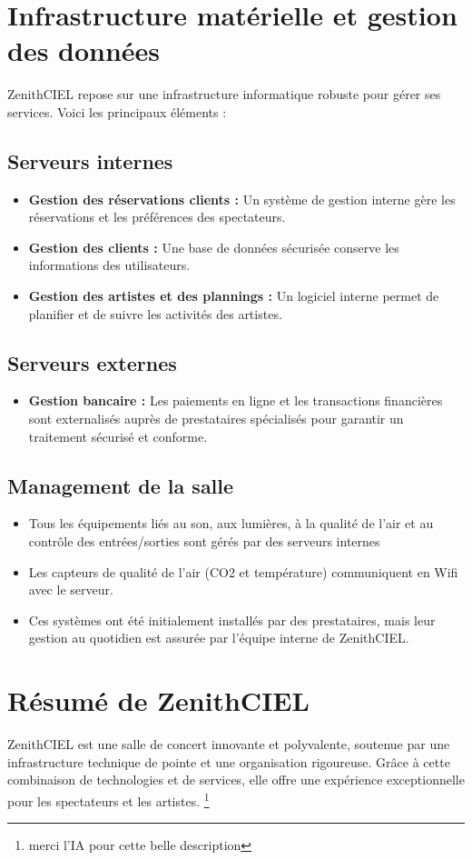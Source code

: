 \documentclass[french, 12pt]{article}%
\newcommand{\itemE}{\item[$\bullet$]}
\begin{document}
\section{Infrastructure matérielle et gestion des données}
ZenithCIEL repose sur une infrastructure informatique robuste pour gérer ses services. Voici les principaux éléments :
\subsection{Serveurs internes}
\begin{itemize}
    \itemE \textbf{Gestion des réservations clients :} Un système de gestion interne gère les réservations et les préférences des spectateurs.
    \itemE \textbf{Gestion des clients :} Une base de données sécurisée conserve les informations des utilisateurs.
    \itemE \textbf{Gestion des artistes et des plannings :} Un logiciel interne permet de planifier et de suivre les activités des artistes.
\end{itemize}

\subsection{Serveurs externes}
\begin{itemize}
    \itemE \textbf{Gestion bancaire :} Les paiements en ligne et les transactions financières sont externalisés auprès de prestataires spécialisés pour garantir un traitement sécurisé et conforme.
\end{itemize}

\subsection{Management de la salle}
\begin{itemize}
    \itemE Tous les équipements liés au son, aux lumières, à la qualité de l'air et au contrôle des entrées/sorties sont gérés par des serveurs internes
    \itemE Les capteurs de qualité de l'air (CO2 et température) communiquent en Wifi avec le serveur.
    \itemE Ces systèmes ont été initialement installés par des prestataires, mais leur gestion au quotidien est assurée par l'équipe interne de ZenithCIEL.
\end{itemize}


\section{Résumé de ZenithCIEL}
ZenithCIEL est une salle de concert innovante et polyvalente, soutenue par une infrastructure technique de pointe et une organisation rigoureuse. Grâce à cette combinaison de technologies et de services, elle offre une expérience exceptionnelle pour les spectateurs et les artistes. \footnote{merci l'IA pour cette belle description}
\end{document}

